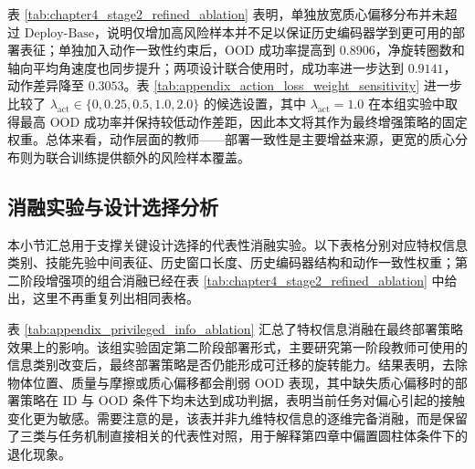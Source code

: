 表 \ref{tab:chapter4_stage2_refined_ablation} 表明，单独放宽质心偏移分布并未超过 \(\mathrm{Deploy\text{-}Base}\)，说明仅增加高风险样本并不足以保证历史编码器学到更可用的部署表征；单独加入动作一致性约束后，OOD 成功率提高到 \(0.8906\)，净旋转圈数和轴向平均角速度也同步提升；两项设计联合使用时，成功率进一步达到 \(0.9141\)，动作差异降至 \(0.3053\)。表 \ref{tab:appendix_action_loss_weight_sensitivity} 进一步比较了 \(\lambda_{\mathrm{act}}\in\{0,0.25,0.5,1.0,2.0\}\) 的候选设置，其中 \(\lambda_{\mathrm{act}}=1.0\) 在本组实验中取得最高 OOD 成功率并保持较低动作差距，因此本文将其作为最终增强策略的固定权重。总体来看，动作层面的教师——部署一致性是主要增益来源，更宽的质心分布则为联合训练提供额外的风险样本覆盖。

\subsection{消融实验与设计选择分析}
\thesisbodyfont

\newcommand{\ablationcompacttable}{%
    \zihao{5}%
    \setlength{\tabcolsep}{3pt}%
    \setlength{\aboverulesep}{0.35ex}%
    \setlength{\belowrulesep}{0.35ex}%
    \renewcommand{\arraystretch}{1.0}%
}

本小节汇总用于支撑关键设计选择的代表性消融实验。以下表格分别对应特权信息类别、技能先验中间表征、历史窗口长度、历史编码器结构和动作一致性权重；第二阶段增强项的组合消融已经在表 \ref{tab:chapter4_stage2_refined_ablation} 中给出，这里不再重复列出相同表格。

表 \ref{tab:appendix_privileged_info_ablation} 汇总了特权信息消融在最终部署策略效果上的影响。该组实验固定第二阶段部署形式，主要研究第一阶段教师可使用的信息类别改变后，最终部署策略是否仍能形成可迁移的旋转能力。结果表明，去除物体位置、质量与摩擦或质心偏移都会削弱 OOD 表现，其中缺失质心偏移时的部署策略在 ID 与 OOD 条件下均未达到成功判据，表明当前任务对偏心引起的接触变化更为敏感。需要注意的是，该表并非九维特权信息的逐维完备消融，而是保留了三类与任务机制直接相关的代表性对照，用于解释第四章中偏置圆柱体条件下的退化现象。

